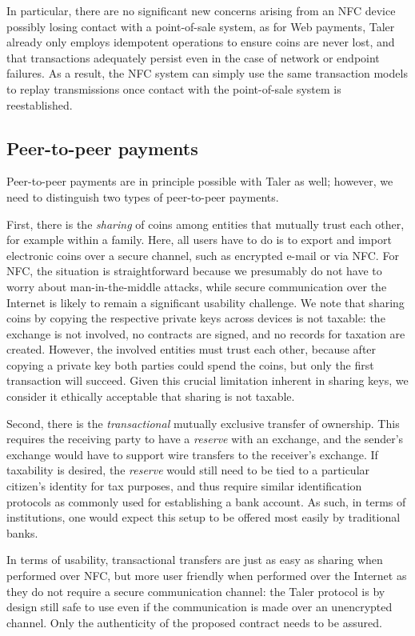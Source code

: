 \documentclass{llncs}
\begin{document}
In particular, there are no significant new concerns arising from an
NFC device possibly losing contact with a point-of-sale system, as for
Web payments, Taler already only employs idempotent operations to
ensure coins are never lost, and that transactions adequately persist
even in the case of network or endpoint failures.  As a result, the
NFC system can simply use the same transaction models to replay
transmissions once contact with the point-of-sale system is
reestablished.


\subsection{Peer-to-peer payments}

Peer-to-peer payments are in principle possible with Taler as well;
however, we need to distinguish two types of peer-to-peer payments.

First, there is the {\em sharing} of coins among entities that
mutually trust each other, for example within a family.  Here, all
users have to do is to export and import electronic coins over a
secure channel, such as encrypted e-mail or via NFC.  For NFC, the
situation is straightforward because we presumably do not have to worry
about man-in-the-middle attacks, while secure communication over the
Internet is likely to remain a significant usability challenge.  We
note that sharing coins by copying the respective private keys across
devices is not taxable: the exchange is not involved, no contracts are
signed, and no records for taxation are created.  However, the
involved entities must trust each other, because after copying a private
key both parties could spend the coins, but only the first transaction
will succeed.  Given this crucial limitation
inherent in sharing keys, we consider it ethically acceptable that
sharing is not taxable.

Second, there is the {\em transactional} mutually exclusive transfer
of ownership.  This requires the receiving party to have a {\em
  reserve} with an exchange, and the sender's exchange would have to
support wire transfers to the receiver's exchange.  If taxability is
desired, the {\em reserve} would still need to be tied to a particular
citizen's identity for tax purposes, and thus require similar
identification protocols as commonly used for establishing a bank
account.  As such, in terms of institutions, one would expect this
setup to be offered most easily by traditional banks.

In terms of usability, transactional
transfers are just as easy as sharing when performed over NFC, but
more user friendly when performed over the Internet as they do not
require a secure communication channel: the Taler protocol is by
design still safe to use even if the communication is made over an
unencrypted channel. Only the authenticity of the proposed contract
needs to be assured.
\end{document}
